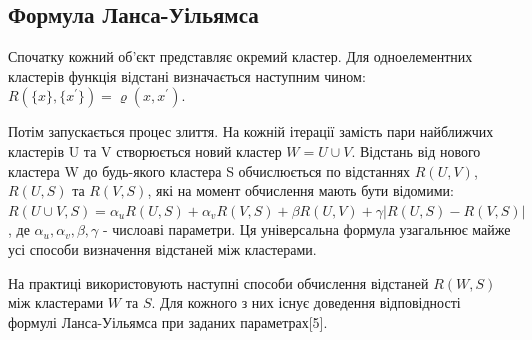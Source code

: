 \documentclass[a4paper,14pt,russian]{extreport}
\begin{document}
   	\subsection{Формула Ланса-Уільямса}
   	Спочатку кожний об'єкт представляє окремий кластер. Для одноелементних кластерів функція відстані визначається наступним чином:  \\
   	$ R ( \{ x \}, \{ x^{'} \} ) = \varrho ( x, x^{'}) $. \par 
   	Потім запускається процес злиття. На кожній ітерації замість пари найближчих кластерів U та V створюється новий кластер $ W = U \cup V $. Відстань від нового кластера W до будь-якого кластера S обчислюється по відстаннях $R(U,V)$, $R(U,S)$ та $R(V,S)$, які на момент обчислення  мають бути відомими: \\
   	$R(U \cup V,S) = \alpha_{u}R(U,S) + \alpha_{v}R(V,S) + \beta R(U,V) + \gamma | R(U,S) - R(V,S)| $, де $\alpha_{u}, \alpha_{v}, \beta, \gamma$ - числоаві параметри. Ця універсальна формула узагальнює майже усі способи визначення відстаней між кластерами.\par 
   	На практиці використовують наступні способи обчислення відстаней $R(W,S)$ між кластерами $W$ та $S$. Для кожного з них існує доведення відповідності формулі Ланса-Уільямса при заданих параметрах[5].
   	\newline
   	
\end{document}
